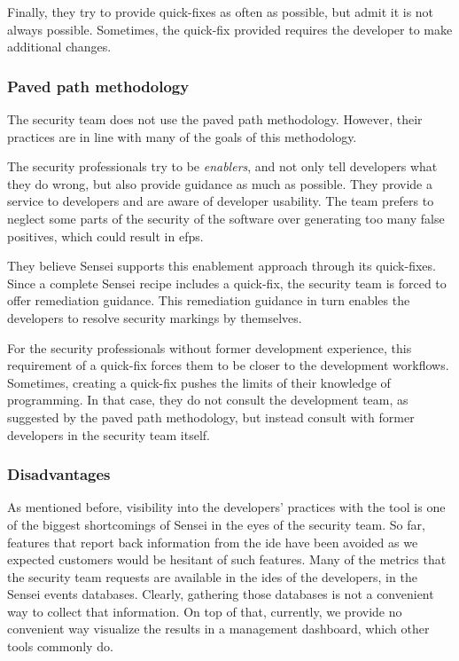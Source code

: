 Finally, they try to provide quick-fixes as often as possible, but admit it is not always possible.
Sometimes, the quick-fix provided requires the developer to make additional changes.

\subsubsection{Paved path methodology}
The security team does not use the paved path methodology.
However, their practices are in line with many of the goals of this methodology.

The security professionals try to be \textit{enablers}, and not only tell developers what they do wrong, but also provide guidance as much as possible.
They provide a service to developers and are aware of developer usability.
The team prefers to neglect some parts of the security of the software over generating too many false positives, which could result in \glspl{efp}.

They believe Sensei supports this enablement approach through its quick-fixes.
Since a complete Sensei recipe includes a quick-fix, the security team is forced to offer remediation guidance.
This remediation guidance in turn enables the developers to resolve security markings by themselves.

For the security professionals without former development experience, this requirement of a quick-fix forces them to be closer to the development workflows.
Sometimes, creating a quick-fix pushes the limits of their knowledge of programming.
In that case, they do not consult the development team, as suggested by the paved path methodology, but instead consult with former developers in the security team itself.

\subsubsection{Disadvantages}
As mentioned before, visibility into the developers' practices with the tool is one of the biggest shortcomings of Sensei in the eyes of the security team.
So far, features that report back information from the \gls{ide} have been avoided as we expected customers would be hesitant of such features.
Many of the metrics that the security team requests are available in the \glspl{ide} of the developers, in the Sensei events databases.
Clearly, gathering those databases is not a convenient way to collect that information.
On top of that, currently, we provide no convenient way visualize the results in a management dashboard, which other tools commonly do.

